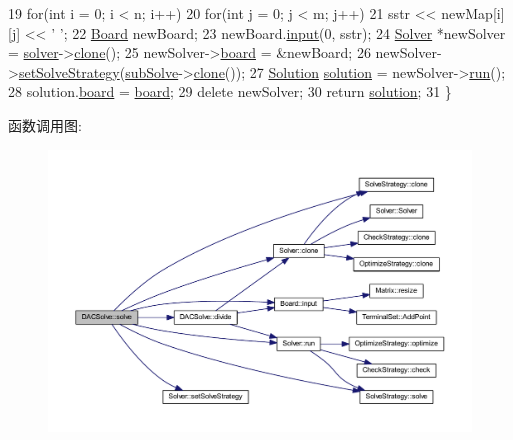 \begin{DoxyCode}
19     \textcolor{keywordflow}{for}(\textcolor{keywordtype}{int} i = 0; i < n; i++)
20         \textcolor{keywordflow}{for}(\textcolor{keywordtype}{int} j = 0; j < m; j++)
21             sstr << newMap[i][j] << \textcolor{charliteral}{' '};
22     \hyperlink{classBoard}{Board} newBoard;
23     newBoard.\hyperlink{classBoard_ace215dfac6b741c9fb51cc40a6fe6ab1}{input}(0, sstr);
24     \hyperlink{classSolver}{Solver} *newSolver = \hyperlink{classSolveStrategy_a94d43c47305176d0d3858697d3410443}{solver}->\hyperlink{classSolver_a1a6f0075358685b01c83188d206e41a5}{clone}();
25     newSolver->\hyperlink{classSolver_a8966a22c2f247addc8ce453d119bc54e}{board} = &newBoard;
26     newSolver->\hyperlink{classSolver_a2b07dd3c581eeb3207036430082cb2f9}{setSolveStrategy}(\hyperlink{classDACSolve_ae29a23fdf07424e738f99abf75de9dd4}{subSolve}->\hyperlink{classSolveStrategy_a49d51ab69b0c47648638819c2f61f247}{clone}());
27     \hyperlink{classSolution}{Solution} \hyperlink{classes_8txt_aa43d5190bbc491d9c9134146e01a248e}{solution} = newSolver->\hyperlink{classSolver_ac0b51cb3578988fe9c461ea3fc424bef}{run}();
28     solution.\hyperlink{classSolution_ac4f88cd3aa0713e8900f33eb9f1f15bf}{board} = \hyperlink{classes_8txt_ab2104b75e0965a7c5fc13208045d9b59}{board};
29     \textcolor{keyword}{delete} newSolver;
30     \textcolor{keywordflow}{return} \hyperlink{classes_8txt_aa43d5190bbc491d9c9134146e01a248e}{solution};
31 \}
\end{DoxyCode}


函数调用图\+:
\nopagebreak
\begin{figure}[H]
\begin{center}
\leavevmode
\includegraphics[width=350pt]{classDACSolve_a45deda5b055671bbcee609cbf1500fdc_cgraph}
\end{center}
\end{figure}




